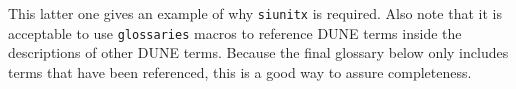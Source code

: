 \documentclass{article}
\begin{document}
This latter one gives an example of why \texttt{siunitx} is required. 
Also note that it is acceptable to use \texttt{glossaries} macros to
reference DUNE terms inside the descriptions of other DUNE terms. 
Because the final glossary below only includes terms that have been
referenced, this is a good way to assure completeness.
 



\cleardoublepage
\printglossaries
\end{document}
